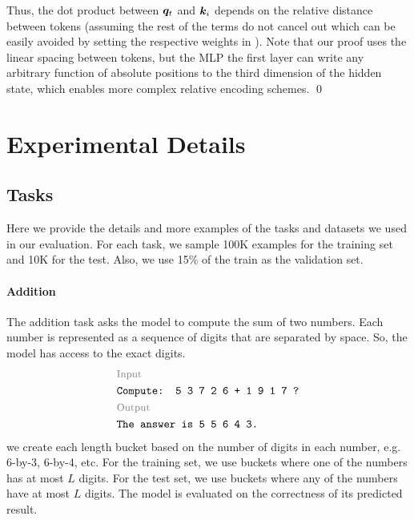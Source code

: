 \documentclass{article}
\begin{document}
Thus, the dot product between ${\bm{q}}_t$ and ${\bm{k}}_i$ depends on the relative distance between tokens (assuming the rest of the terms do not cancel out which can be easily avoided by setting the respective weights in ). Note that our proof uses the linear spacing between tokens, but the MLP the first layer can write any arbitrary function of absolute positions to the third dimension of the hidden state, which enables more complex relative encoding schemes.
\qed


\section{Experimental Details}
\label{sec:exp-details}

\subsection{Tasks}
\label{sec:exp-details-tasks}
Here we provide the details and more examples of the tasks and datasets we used in our evaluation. For each task, we sample 100K examples for the training set and 10K for the test. Also, we use 15\% of the train as the validation set.

\paragraph{Addition}
The addition task \citep{Nye2021:Scratchpad} asks the model to compute the sum of two numbers.
Each number is represented as a sequence of digits that are separated by space. So, the model has access to the exact digits.
\[
  \begin{aligned}
     & \text{\footnotesize \color{gray} Input}  \\
     & \texttt{Compute: 5 3 7 2 6 + 1 9 1 7 ?}  \\
     & \text{\footnotesize \color{gray} Output} \\
     & \texttt{The answer is 5 5 6 4 3.}        \\
  \end{aligned}
\]
we create each length bucket based on the number of digits in each number, e.g. 6-by-3, 6-by-4, etc.
For the training set, we use buckets where one of the numbers has at most $L$ digits. For the test set, we use buckets where any of the numbers have at most $L$ digits. The model is evaluated on the correctness of its predicted result.
\end{document}
